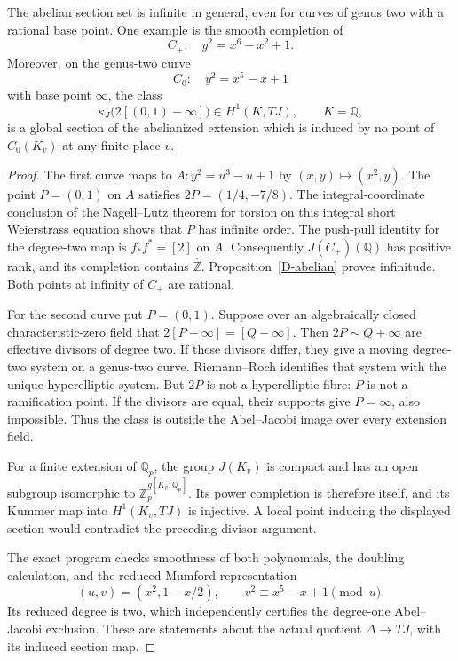 \begin{proposition}
\label{D-abelian-examples}
The abelian section set is infinite in general,
even for curves of genus two with a rational base point.
One example is the smooth completion of
\[
 C_+:\quad y^2=x^6-x^2+1.
\]
Moreover, on the genus-two curve
\[
 C_0:\quad y^2=x^5-x+1
\]
with base point $\infty$, the class
\[
 \kappa_J\bigl(2[(0,1)-\infty]\bigr)
 \in H^1(K,TJ),\qquad K=\mathbb Q,
\]
is a global section of the abelianized extension which
is induced by no point of $C_0(K_v)$ at any finite place
$v$.
\end{proposition}
\begin{proof}
The first curve maps to $A:y^2=u^3-u+1$ by
$(x,y)\mapsto(x^2,y)$. The point $P=(0,1)$ on $A$
satisfies $2P=(1/4,-7/8)$. The integral-coordinate
conclusion of the Nagell--Lutz theorem for torsion
on this integral short Weierstrass equation shows
that $P$ has infinite order. The push-pull identity
for the degree-two map is $f_*f^*=[2]$ on $A$.
Consequently $J(C_+)(\mathbb Q)$ has positive rank,
and its completion contains $\widehat{\mathbb Z}$.
Proposition~\ref{D-abelian} proves infinitude.
Both points at infinity of $C_+$ are rational.

For the second curve put $P=(0,1)$. Suppose over
an algebraically closed characteristic-zero field
that $2[P-\infty]=[Q-\infty]$. Then
$2P\sim Q+\infty$ are effective divisors of degree
two. If these divisors differ, they give a moving
degree-two system on a genus-two curve. Riemann--Roch
identifies that system with the unique hyperelliptic
system. But $2P$ is not a hyperelliptic fibre:
$P$ is not a ramification point. If the divisors
are equal, their supports give $P=\infty$, also
impossible. Thus the class is outside the
Abel--Jacobi image over every extension field.

For a finite extension of $\mathbb Q_p$, the group
$J(K_v)$ is compact and has an open subgroup
isomorphic to $\mathbb Z_p^{g[K_v:\mathbb Q_p]}$.
Its power completion is therefore itself, and
its Kummer map into $H^1(K_v,TJ)$ is injective.
A local point inducing the displayed section
would contradict the preceding divisor argument.

The exact program checks smoothness of both
polynomials, the doubling calculation, and the
reduced Mumford representation
\[
 (u,v)=(x^2,1-x/2),\qquad v^2\equiv x^5-x+1\pmod u .
\]
Its reduced degree is two, which independently
certifies the degree-one Abel--Jacobi exclusion.
These are statements about the actual quotient
$\Delta\to TJ$, with its induced section map.
\end{proof}


